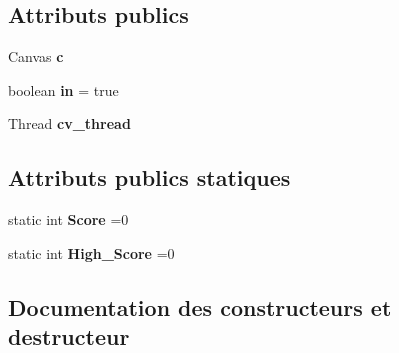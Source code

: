 \subsection*{Attributs publics}
\begin{DoxyCompactItemize}
\item 
\hypertarget{classp8_1_1demo_1_1p8sokoban_1_1_sokoban_view_adc4918b7a35d3b66e35634a91c3d177e}{}Canvas {\bfseries c}\label{classp8_1_1demo_1_1p8sokoban_1_1_sokoban_view_adc4918b7a35d3b66e35634a91c3d177e}

\item 
\hypertarget{classp8_1_1demo_1_1p8sokoban_1_1_sokoban_view_a8687c2a2d608dca85e54f1d961cce7f5}{}boolean {\bfseries in} = true\label{classp8_1_1demo_1_1p8sokoban_1_1_sokoban_view_a8687c2a2d608dca85e54f1d961cce7f5}

\item 
\hypertarget{classp8_1_1demo_1_1p8sokoban_1_1_sokoban_view_a50614f7a9544e6f522cb166bc7e81208}{}Thread {\bfseries cv\+\_\+thread}\label{classp8_1_1demo_1_1p8sokoban_1_1_sokoban_view_a50614f7a9544e6f522cb166bc7e81208}

\end{DoxyCompactItemize}
\subsection*{Attributs publics statiques}
\begin{DoxyCompactItemize}
\item 
\hypertarget{classp8_1_1demo_1_1p8sokoban_1_1_sokoban_view_aa04bdcb5159dd484c318536e75644661}{}static int {\bfseries Score} =0\label{classp8_1_1demo_1_1p8sokoban_1_1_sokoban_view_aa04bdcb5159dd484c318536e75644661}

\item 
\hypertarget{classp8_1_1demo_1_1p8sokoban_1_1_sokoban_view_a3c41b8c3e28c47feab2b45315493d729}{}static int {\bfseries High\+\_\+\+Score} =0\label{classp8_1_1demo_1_1p8sokoban_1_1_sokoban_view_a3c41b8c3e28c47feab2b45315493d729}

\end{DoxyCompactItemize}


\subsection{Documentation des constructeurs et destructeur}
\hypertarget{classp8_1_1demo_1_1p8sokoban_1_1_sokoban_view_a9b77c402af6779c46c11e0bd6572eeec}{}
